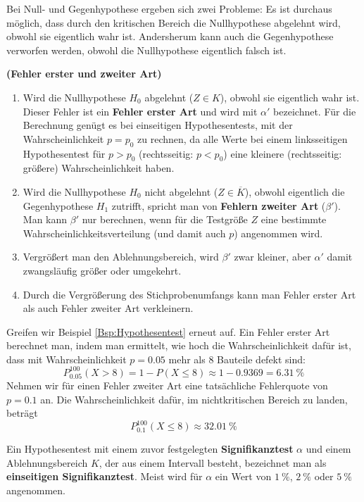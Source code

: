 \documentclass[ngerman, 12pt]{nssheetxea}
\begin{document}
Bei Null- und Gegenhypothese ergeben sich zwei Probleme: Es ist durchaus möglich, dass durch den kritischen Bereich die Nullhypothese abgelehnt wird, obwohl sie eigentlich wahr ist. Andersherum kann auch die Gegenhypothese verworfen werden, obwohl die Nullhypothese eigentlich falsch ist.

\begin{theorem} \textbf{(Fehler erster und zweiter Art)}
\begin{enumerate}
\item Wird die Nullhypothese $H_0$ abgelehnt ($Z \in K$), obwohl sie eigentlich wahr ist. Dieser Fehler ist ein \textbf{Fehler erster Art} und wird mit $\alpha'$ bezeichnet. Für die Berechnung genügt es bei einseitigen Hypothesentests, mit der Wahrscheinlichkeit $p=p_0$ zu rechnen, da alle Werte bei einem linksseitigen Hypothesentest für $p>p_0$ (rechtsseitig: $p<p_0$) eine kleinere (rechtsseitig: größere) Wahrscheinlichkeit haben.
\item Wird die Nullhypothese $H_0$ nicht abgelehnt ($Z \in \overline{K}$), obwohl eigentlich die Gegenhypothese $H_1$ zutrifft, spricht man von \textbf{Fehlern zweiter Art} ($\beta'$). Man kann $\beta'$ nur berechnen, wenn für die Testgröße $Z$ eine bestimmte Wahrscheinlichkeitsverteilung (und damit auch $p$) angenommen wird.
\item Vergrößert man den Ablehnungsbereich, wird $\beta'$ zwar kleiner, aber $\alpha'$ damit zwangsläufig größer oder umgekehrt.
\item Durch die Vergrößerung des Stichprobenumfangs kann man Fehler erster Art als auch Fehler zweiter Art verkleinern.
\end{enumerate}
\end{theorem}

\begin{example}
Greifen wir Beispiel \ref{Bsp:Hypothesentest} erneut auf. Ein Fehler erster Art berechnet man, indem man ermittelt, wie hoch die Wahrscheinlichkeit dafür ist, dass mit Wahrscheinlichkeit $p=\num{0,05}$ mehr als 8 Bauteile defekt sind:
\[ P_{\num{0,05}}^{100} (X>8)= 1-P(X\leq 8) \approx 1 - \num{0,9369} = \SI{6,31}{\percent}\]
Nehmen wir für einen Fehler zweiter Art eine tatsächliche Fehlerquote von $p=\num{0,1}$ an. Die Wahrscheinlichkeit dafür, im nichtkritischen Bereich zu landen, beträgt
\[ P_{\num{0,1}}^{100} (X\leq 8) \approx \SI{32,01}{\percent}  \] 
\end{example}

\begin{definition}
Ein Hypothesentest mit einem zuvor festgelegten \textbf{Signifikanztest} $\alpha$ und einem Ablehnungsbereich $K$, der aus einem Intervall besteht, bezeichnet man als \textbf{einseitigen Signifikanztest}. Meist wird für $\alpha$ ein Wert von $\SI{1}{\percent}$, $\SI{2}{\percent}$ oder $\SI{5}{\percent}$ angenommen.
\end{definition}
\end{document}
